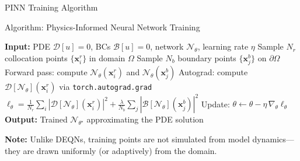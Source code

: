 \documentclass[aspectratio=169,11pt]{beamer}
\newcommand{\emphc}[1]{\textcolor{harvardcrimson}{#1}}
\newcommand{\x}{\bm{x}}
\begin{document}
\begin{frame}{PINN Training Algorithm}
\begin{block}{Algorithm: Physics-Informed Neural Network Training}
\begin{algorithmic}
\footnotesize
\STATE \textbf{Input:} PDE $\mathcal{D}[u]=0$, BCs $\mathcal{B}[u]=0$, network $\mathcal{N}_\theta$, learning rate $\eta$
    \STATE Sample $N_r$ collocation points $\{\x_i^r\}$ in domain $\Omega$
    \STATE Sample $N_b$ boundary points $\{\x_j^b\}$ on $\partial\Omega$
    \STATE Forward pass: compute $\mathcal{N}_\theta(\x_i^r)$ and $\mathcal{N}_\theta(\x_j^b)$
    \STATE Autograd: compute $\mathcal{D}[\mathcal{N}_\theta](\x_i^r)$ via \texttt{torch.autograd.grad}
    \STATE $\ell_\theta = \frac{1}{N_r}\sum_i |\mathcal{D}[\mathcal{N}_\theta](\x_i^r)|^2 + \frac{\lambda}{N_b}\sum_j |\mathcal{B}[\mathcal{N}_\theta](\x_j^b)|^2$
    \STATE Update: $\theta \leftarrow \theta - \eta\,\nabla_\theta \ell_\theta$
\ENDFOR
\STATE \textbf{Output:} Trained $\mathcal{N}_{\theta^\star}$ approximating the PDE solution
\end{algorithmic}
\end{block}

\vspace{0.2em}
{\small \textbf{Note:} Unlike DEQNs, training points are \emphc{not} simulated from model dynamics---they are drawn uniformly (or adaptively) from the domain.}
\end{frame}
\end{document}
